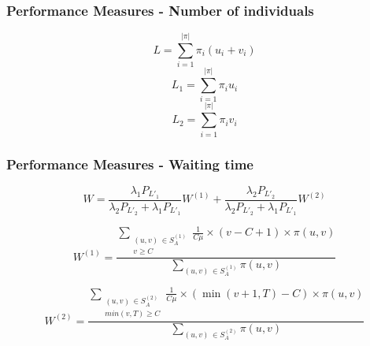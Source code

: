 \begin{frame}
    \frametitle{Performance Measures - Number of individuals}
    \centering

    \pause

    \begin{equation*}
        L = \sum_{i=1}^{|\pi|} \pi_{i} (u_i + v_i) 
    \end{equation*}
    \begin{equation*}
        L_1 = \sum_{i=1}^{|\pi|} \pi_{i} u_i 
    \end{equation*}
    \begin{equation*}
        L_2 = \sum_{i=1}^{|\pi|} \pi_{i} v_i 
    \end{equation*}

\end{frame}


\begin{frame}
    \frametitle{Performance Measures - Waiting time}
    \centering

    \begin{equation*}
        W = \frac{\lambda_1 P_{L'_1}}{\lambda_2 P_{L'_2} + \lambda_1 P_{L'_1}} W^{(1)} 
        + \frac{\lambda_2 P_{L'_2}}{\lambda_2 P_{L'_2} + \lambda_1 P_{L'_1}} W^{(2)}
    \end{equation*}

    \begin{equation*}
        W^{(1)} = \frac{\sum_{\substack{(u,v) \, \in S_A^{(1)} \\ v \geq C}} 
        \frac{1}{C \mu} \times (v-C+1) \times \pi(u,v)}{\sum_{(u,v) \, 
        \in S_A^{(1)}} \pi(u,v)}
    \end{equation*}
        
    \begin{equation*}
        W^{(2)} = \frac{\sum_{\substack{(u,v) \, \in S_A^{(2)} \\ min(v,T) \geq C}} 
        \frac{1}{C \mu} \times (\min(v+1,T)-C) \times \pi(u,v)}{\sum_{(u,v) \, 
        \in S_A^{(2)}} \pi(u,v)}
    \end{equation*} 

\end{frame}


